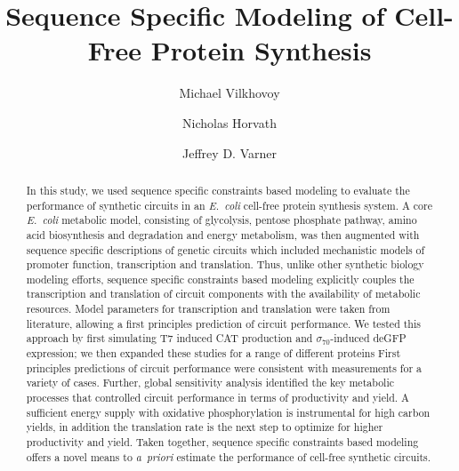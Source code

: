 \documentclass[journal=asbcd6,manuscript=article]{achemso}
\author{Michael Vilkhovoy}
\author{Nicholas Horvath}
\author{Jeffrey D. Varner}
\affiliation[Cornell University]
{Robert Frederick Smith School of Chemical and Biomolecular Engineering, Cornell University, Ithaca, NY 14853}
\title{Sequence Specific Modeling of Cell-Free Protein Synthesis}
\begin{document}
\begin{abstract}
In this study, we used sequence specific constraints based modeling to evaluate the performance of synthetic circuits in an \emph{E.~coli} cell-free protein synthesis system.
A core \emph{E.~coli} metabolic model, consisting of glycolysis, pentose phosphate pathway, amino acid biosynthesis and degradation and energy metabolism, was then augmented with sequence specific descriptions of genetic circuits which included mechanistic models of promoter function, transcription and translation.
Thus, unlike other synthetic biology modeling efforts, sequence specific constraints based modeling explicitly couples the transcription and translation of circuit components with the availability of metabolic resources.
Model parameters for transcription and translation were taken from literature, allowing a first principles prediction of circuit performance.
We tested this approach by first simulating T7 induced CAT production and $\sigma_{70}$-induced deGFP expression; we then expanded these studies for a range of different proteins
First principles predictions of circuit performance were consistent with measurements for a variety of cases.
Further, global sensitivity analysis identified the key metabolic processes that controlled circuit performance in terms of productivity and yield.
A sufficient energy supply with oxidative phosphorylation is instrumental for high carbon yields, in addition the translation rate is the next step to optimize for higher productivity and yield.
Taken together, sequence specific constraints based modeling offers a novel means to \emph{a~priori} estimate the performance of cell-free synthetic circuits.
\end{abstract}

\end{document}
